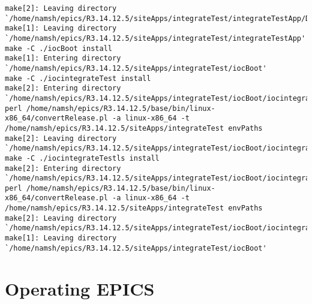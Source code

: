 \documentclass[11pt
  , a4paper
  , article
  , oneside
]{memoir}
\begin{document}
\begin{lstlisting}[style=termstyle]
make[2]: Leaving directory `/home/namsh/epics/R3.14.12.5/siteApps/integrateTest/integrateTestApp/Db'
make[1]: Leaving directory `/home/namsh/epics/R3.14.12.5/siteApps/integrateTest/integrateTestApp'
make -C ./iocBoot install 
make[1]: Entering directory `/home/namsh/epics/R3.14.12.5/siteApps/integrateTest/iocBoot'
make -C ./iocintegrateTest install 
make[2]: Entering directory `/home/namsh/epics/R3.14.12.5/siteApps/integrateTest/iocBoot/iocintegrateTest'
perl /home/namsh/epics/R3.14.12.5/base/bin/linux-x86_64/convertRelease.pl -a linux-x86_64 -t /home/namsh/epics/R3.14.12.5/siteApps/integrateTest envPaths
make[2]: Leaving directory `/home/namsh/epics/R3.14.12.5/siteApps/integrateTest/iocBoot/iocintegrateTest'
make -C ./iocintegrateTestls install 
make[2]: Entering directory `/home/namsh/epics/R3.14.12.5/siteApps/integrateTest/iocBoot/iocintegrateTestls'
perl /home/namsh/epics/R3.14.12.5/base/bin/linux-x86_64/convertRelease.pl -a linux-x86_64 -t /home/namsh/epics/R3.14.12.5/siteApps/integrateTest envPaths
make[2]: Leaving directory `/home/namsh/epics/R3.14.12.5/siteApps/integrateTest/iocBoot/iocintegrateTestls'
make[1]: Leaving directory `/home/namsh/epics/R3.14.12.5/siteApps/integrateTest/iocBoot'
\end{lstlisting}
\section{Operating EPICS}
\end{document}
